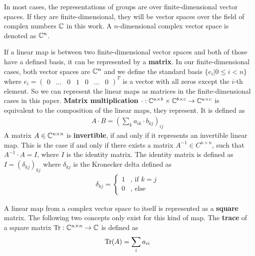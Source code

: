 In most cases, the representations of groups are over finite-dimensional vector spaces.
If they are finite-dimensional, they will be vector spaces over the field of complex numbers $\mathbb{C}$ in this work.
A $n$-dimensional complex vector space is denoted as $\mathbb{C}^n$.

If a linear map is between two finite-dimensional vector spaces and both of those have a defined basis, it can be represented by a \textbf{matrix}.
In our finite-dimensional cases, both vector spaces are $\mathbb{C}^n$ and we define the standard basis $\{e_i | 0 \leq i < n\}$ where $e_i = \begin{pmatrix} 0 & \ldots & 0 & 1 & 0 & \ldots & 0 \end{pmatrix}^T$ is a vector with all zeros except the $i$-th element.
So we can represent the linear maps as matrices in the finite-dimensional cases in this paper.
\textbf{Matrix multiplication} $\cdot: \mathbb{C}^{a \times b} \times \mathbb{C}^{b \times c} \to \mathbb{C}^{a \times c}$ is equivalent to the composition of the linear maps, they represent.
It is defined as
\begin{align}
    A \cdot B = \left(\sum_k a_{ik} \cdot b_{kj}\right)_{ij}
\end{align}
A matrix $A \in \mathbb{C}^{n \times n}$ is \textbf{invertible}, if and only if it represents an invertible linear map.
This is the case if and only if there exists a matrix $A^{-1} \in C^{n \times n}$, such that $A^{-1} \cdot A = I$, where $I$ is the identity matrix. 
The identity matrix is defined as $I = (\delta_{kj})_{kj}$ where $\delta_{kj}$ is the Kronecker delta defined as
\begin{align}
    \delta_{kj} = \begin{cases}
        1 & \text{, if } k = j \\
        0 & \text{, else}
    \end{cases}
\end{align}

A linear map from a complex vector space to itself is represented as a \textbf{square} matrix.
The following two concepts only exist for this kind of map.
The \textbf{trace} of a square matrix $\operatorname{Tr}: \mathbb{C}^{n \times n} \to \mathbb{C}$ is defined as
\begin{align}
    \operatorname{Tr}(A) = \sum_i a_{ii}
\end{align}

